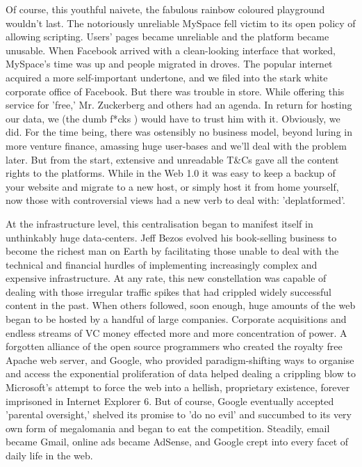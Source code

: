 Of course, this youthful naivete, the fabulous rainbow coloured playground wouldn't last. The notoriously unreliable MySpace fell victim to its open policy of allowing scripting. Users' pages became unreliable and the platform became unusable. When Facebook arrived with a clean-looking interface that worked, MySpace's time was up and people migrated in droves. The popular internet acquired a more self-important undertone, and we filed into the stark white corporate office of Facebook. But there was trouble in store. While offering this service for 'free,' Mr. Zuckerberg and others had an agenda. In return for hosting our data, we (the dumb f*cks \cite{carlson2010ims}) would have to trust him with it. Obviously, we did. For the time being, there was ostensibly no business model, beyond luring in more venture finance, amassing huge user-bases and we'll deal with the problem later. But from the start, extensive and unreadable T\&Cs gave all the content rights to the platforms. While in the Web 1.0 it was easy to keep a backup of your website and migrate to a new host, or simply host it from home yourself, now those with controversial views had a new verb to deal with: 'deplatformed'.

At the infrastructure level, this centralisation began to manifest itself in unthinkably huge data-centers. Jeff Bezos evolved his book-selling business to become the richest man on Earth by facilitating those unable to deal with the technical and financial hurdles of implementing increasingly complex and expensive infrastructure. At any rate, this new constellation was capable of dealing with those irregular traffic spikes that had crippled widely successful content in the past. When others followed, soon enough, huge amounts of the web began to be hosted by a handful of large companies. Corporate acquisitions and endless streams of VC money effected more and more concentration of power. A forgotten alliance of the open source programmers who created the royalty free Apache web server, and Google, who provided paradigm-shifting ways to organise and access the exponential proliferation of data helped dealing a crippling blow to Microsoft's attempt to force the web into a hellish, proprietary existence, forever imprisoned in Internet Explorer 6. But of course, Google eventually accepted 'parental oversight,' shelved its promise to 'do no evil' and succumbed to its very own form of megalomania and began to eat the competition. Steadily, email became Gmail, online ads became AdSense, and Google crept into every facet of daily life in the web.


